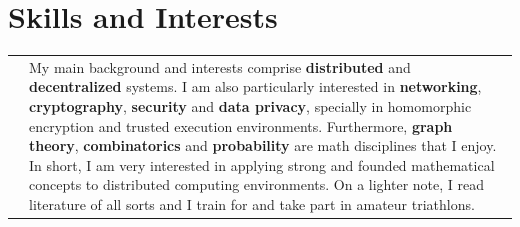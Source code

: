 \documentclass[a4paper,10pt]{article} %
\begin{document}
\section{Skills and Interests}

\begin{tabular}{R{1.5cm}|p{13.8cm}}
    & {My main background and interests comprise \textbf{distributed} and \textbf{decentralized} systems. I am also particularly interested in \textbf{networking}, \textbf{cryptography}, \textbf{security} and \textbf{data privacy}, specially in homomorphic encryption and trusted execution environments. Furthermore, \textbf{graph theory}, \textbf{combinatorics} and \textbf{probability} are math disciplines that I enjoy. In short, I am very interested in applying strong and founded mathematical concepts to distributed computing environments. On a lighter note, I read literature of all sorts and I train for and take part in amateur triathlons.}  \\
\end{tabular}

%
%
\end{document}
